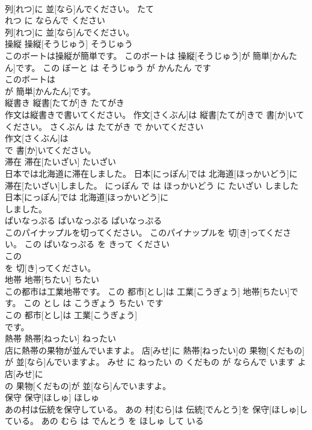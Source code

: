 \documentclass[8pt]{extreport}
\begin{document}
\begin{CJK}{UTF8}{min}
\\	列[れつ]に 並[なら]んでください。	たて 
\\	れつ に ならんで ください	
\\	列[れつ]に 並[なら]んでください。			
\\	操縦	操縦[そうじゅう]	そうじゅう	
\\	このボートは操縦が簡単です。	このボートは 操縦[そうじゅう]が 簡単[かんたん]です。	この ぼーと は そうじゅう が かんたん です	
\\	このボートは
\\	が 簡単[かんたん]です。			
\\	縦書き	縦書[たてが]き	たてがき	
\\	作文は縦書きで書いてください。	作文[さくぶん]は 縦書[たてが]きで 書[か]いてください。	さくぶん は たてがき で かいてください	
\\	作文[さくぶん]は
\\	で 書[か]いてください。			
\\	滞在	滞在[たいざい]	たいざい	
\\	日本では北海道に滞在しました。	日本[にっぽん]では 北海道[ほっかいどう]に 滞在[たいざい]しました。	にっぽん で は ほっかいどう に たいざい しました	
\\	日本[にっぽん]では 北海道[ほっかいどう]に
\\	しました。			
\\	ぱいなっぷる	ぱいなっぷる	ぱいなっぷる	
\\	このパイナップルを切ってください。	このパイナップルを 切[き]ってください。	この ぱいなっぷる を きって ください	
\\	この
\\	を 切[き]ってください。			
\\	地帯	地帯[ちたい]	ちたい	
\\	この都市は工業地帯です。	この 都市[とし]は 工業[こうぎょう] 地帯[ちたい]です。	この とし は こうぎょう ちたい です	
\\	この 都市[とし]は 工業[こうぎょう]
\\	です。			
\\	熱帯	熱帯[ねったい]	ねったい	
\\	店に熱帯の果物が並んでいますよ。	店[みせ]に 熱帯[ねったい]の 果物[くだもの]が 並[なら]んでいますよ。	みせ に ねったい の くだもの が ならんで います よ	
\\	店[みせ]に
\\	の 果物[くだもの]が 並[なら]んでいますよ。			
\\	保守	保守[ほしゅ]	ほしゅ	
\\	あの村は伝統を保守している。	あの 村[むら]は 伝統[でんとう]を 保守[ほしゅ]している。	あの むら は でんとう を ほしゅ して いる	

\end{CJK}
\end{document}
